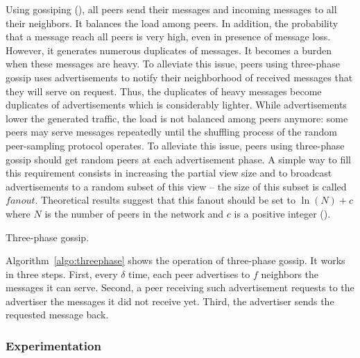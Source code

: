 Using gossiping (\REF), all peers send their messages and incoming messages to
all their neighbors. It balances the load among peers. In addition, the
probability that a message reach all peers is very high, even in presence of
message loss.  However, it generates numerous duplicates of messages. It becomes
a burden when these messages are heavy. To alleviate this issue, peers using
three-phase gossip uses advertisements to notify their neighborhood of received
messages that they will serve on request. Thus, the duplicates of heavy messages
become duplicates of advertisements which is considerably lighter. While
advertisements lower the generated traffic, the load is not balanced among peers
anymore: some peers may serve messages repeatedly until the shuffling process of
the random peer-sampling protocol operates. To alleviate this issue, peers using
three-phase gossip should get random peers at each advertisement phase. A simple
way to fill this requirement consists in increasing the partial view size and to
broadcast advertisements to a random subset of this view -- the size of this
subset is called $fanout$. Theoretical results suggest that this fanout should
be set to $\ln(N)+c$ where $N$ is the number of peers in the network and $c$ is
a positive integer (\REF).

\begin{algorithm}[h]
  
  \caption{\label{algo:threephase}Three-phase gossip.}
\end{algorithm}

Algorithm~\ref{algo:threephase} shows the operation of three-phase gossip. It
works in three steps. First, every $\delta$ time, each peer advertises to $f$
neighbors the messages it can serve. Second, a peer receiving such advertisement
requests to the advertiser the messages it did not receive yet. Third, the
advertiser sends the requested message back.

\subsubsection{Experimentation}


